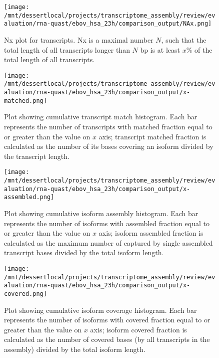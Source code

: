 \documentclass[12pt,a4paper]{article}
\begin{document}
\begin{figure}[t]
\centering
\texttt{[image: /mnt/dessertlocal/projects/transcriptome\_assembly/review/evaluation/rna-quast/ebov\_hsa\_23h/comparison\_output/NAx.png]}
\caption{Nx plot for transcripts. Nx is a maximal number $N$, such that the total length of all transcripts longer than $N$ bp is at least $x\%$ of the total length of all transcripts.}
\end{figure}
\FloatBarrier
\clearpage


\begin{figure}[t]
\centering
\texttt{[image: /mnt/dessertlocal/projects/transcriptome\_assembly/review/evaluation/rna-quast/ebov\_hsa\_23h/comparison\_output/x-matched.png]}
\caption{Plot showing cumulative transcript match histogram. Each bar represents the number of transcripts with matched fraction equal to or greater than the value on $x$ axis; transcript matched fraction is calculated as the number of its bases covering an isoform divided by the transcript length.}
\end{figure}
\FloatBarrier
\clearpage


\begin{figure}[t]
\centering
\texttt{[image: /mnt/dessertlocal/projects/transcriptome\_assembly/review/evaluation/rna-quast/ebov\_hsa\_23h/comparison\_output/x-assembled.png]}
\caption{Plot showing cumulative isoform assembly histogram. Each bar represents the number of isoforms with assembled fraction equal to or greater than the value on $x$ axis; isoform assembled fraction is calculated as the maximum number of captured by single assembled transcript bases divided by the total isoform length.}
\end{figure}
\FloatBarrier
\clearpage


\begin{figure}[t]
\centering
\texttt{[image: /mnt/dessertlocal/projects/transcriptome\_assembly/review/evaluation/rna-quast/ebov\_hsa\_23h/comparison\_output/x-covered.png]}
\caption{Plot showing cumulative isoform coverage histogram. Each bar represents the number of isoforms with covered fraction equal to or greater than the value on $x$ axis; isoform covered fraction is calculated as the number of covered bases (by all transcripts in the assembly) divided by the total isoform length.}
\end{figure}
\FloatBarrier
\clearpage
\end{document}
